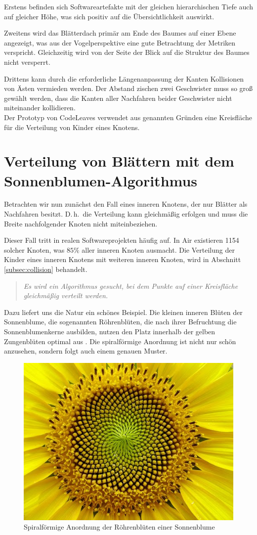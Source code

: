 Erstens befinden sich Softwareartefakte mit der gleichen hierarchischen Tiefe auch auf gleicher Höhe, was sich positiv auf die Übersichtlichkeit auswirkt.

Zweitens wird das Blätterdach primär am Ende des Baumes auf einer Ebene angezeigt, was aus der Vogelperspektive eine gute Betrachtung der Metriken verspricht. Gleichzeitig wird von der Seite der Blick auf die Struktur des Baumes nicht versperrt.

Drittens kann durch die erforderliche Längenanpassung der Kanten Kollisionen von Ästen vermieden werden. Der Abstand zischen zwei Geschwister muss so groß gewählt werden, dass die Kanten aller Nachfahren beider Geschwister nicht miteinander kollidieren.\\

Der Prototyp von CodeLeaves verwendet aus genannten Gründen eine Kreisfläche für die Verteilung von Kinder eines Knotens.

\section{Verteilung von Blättern mit dem Sonnenblumen-Algorithmus}
\label{sec:sunflower}

Betrachten wir nun zunächst den Fall eines inneren Knotens, der nur Blätter als Nachfahren besitzt. D.\,h.\ die Verteilung kann gleichmäßig erfolgen und muss die Breite nachfolgender Knoten nicht miteinbeziehen.

Dieser Fall tritt in realen Softwareprojekten häufig auf. In Air existieren 1154 solcher Knoten, was $85\%$ aller inneren Knoten ausmacht. Die Verteilung der Kinder eines inneren Knotens mit weiteren inneren Knoten, wird in Abschnitt \ref{subsec:collision} behandelt.

\begin{quote}
  \textit{Es wird ein Algorithmus gesucht, bei dem Punkte auf einer Kreisfläche gleichmäßig verteilt werden.}
\end{quote}

Dazu liefert uns die Natur ein schönes Beispiel. Die kleinen inneren Blüten der Sonnenblume, die sogenannten Röhrenblüten, die nach ihrer Befruchtung die Sonnenblumenkerne ausbilden, nutzen den Platz innerhalb der gelben Zungenblüten optimal aus \cite{zimmermann2017sonnenblume}. Die spiralförmige Anordnung ist nicht nur schön anzusehen, sondern folgt auch einem genauen Muster.

\begin{figure}[htb]
  \includegraphics[width=.5\textwidth]{figures/sunflower-seeds}
  \caption{Spiralförmige Anordnung der Röhrenblüten einer Sonnenblume \cite{blender2017howto}}
  \label{fig:sunflower-seeds}
\end{figure}

